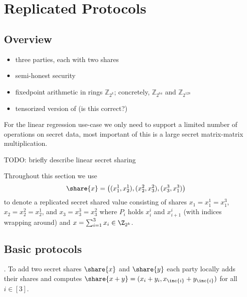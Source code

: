 \section{Replicated Protocols}


\subsection{Overview}

\begin{itemize}
    \item three parties, each with two shares
    \item semi-honest security
    \item fixedpoint arithmetic in rings $\mathbb{Z}_{2^{k}}$; concretely, $\mathbb{Z}_{2^{64}}$ and $\mathbb{Z}_{2^{128}}$
    \item tensorized version of \cite{CCS:AFLNO16} (is this correct?)
\end{itemize}

For the linear regression use-case we only need to support a limited number of
operations on secret data, most important of this is a large secret matrix-matrix
multiplication.

TODO: briefly describe linear secret sharing

Throughout this section we use 
$$
\share{x} = \big((x_1^1, x_2^1), (x_2^2, x_3^2), (x_3^3, x_1^3)\big)
$$ to denote a replicated secret shared value consisting of shares $x_1 = x_1^1 = x_1^3$, $x_2 = x_2^2 = x_2^1$, and $x_3 = x_3^3 = x_3^2$ where $P_i$ holds $x_i^i$ and $x_{i+1}^i$ (with indices wrapping around) and $x = \sum_{i=1}^3 x_i \in \Z_{2^k}$. 

\subsection{Basic protocols}

. To add two secret shares $\share{x}$ and $\share{y}$
each party locally adds their shares and computes $\share{x+y} =
(x_i + y_i, x_{\inc{i}} + y_{\inc{i}})$ for all $i \in [3]$.

